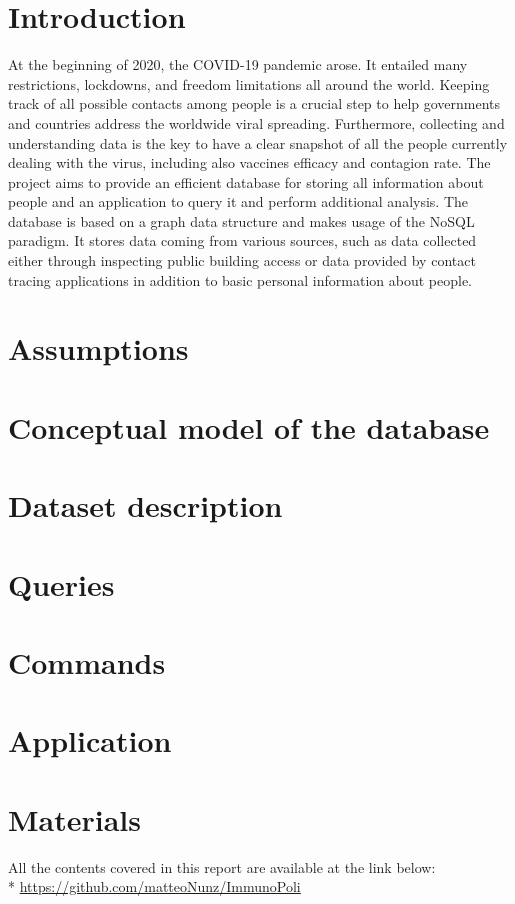 \documentclass[a4paper, 12p]{article}
\newcommand{\link}[1]{{\color{blue}\href{#1}{#1}}}
\begin{document}
\mbox{}


\tableofcontents
{}

\newpage

\setcounter{page}{1}
\section{Introduction}
At the beginning of 2020, the COVID-19 pandemic arose. It entailed many restrictions, lockdowns, and freedom limitations all around the world.
Keeping track of all possible contacts among people is a crucial step to help governments and countries address the worldwide viral spreading.
Furthermore, collecting and understanding data is the key to have a clear snapshot of all the people currently dealing with the virus, including also vaccines efficacy and contagion rate.
The project aims to provide an efficient database for storing all information about people and an application to query it and perform additional analysis.
The database is based on a graph data structure and makes usage of the NoSQL paradigm.
It stores data coming from various sources, such as data collected either through inspecting public building access or data provided by contact tracing applications in addition to basic personal information about people.

\section{Assumptions}


\newpage

\section{Conceptual model of the database}

\newpage
\section{Dataset description}


\section{Queries}

\newpage
\section{Commands}

\newpage
\section{Application}

\newpage
\section{Materials}
All the contents covered in this report are available at the link below:\\* \link{https://github.com/matteoNunz/ImmunoPoli}
\end{document}
